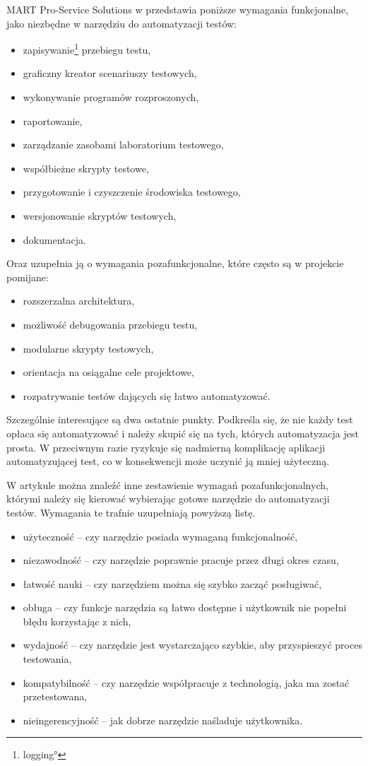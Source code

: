 \documentclass[00-praca-magisterska.tex]{subfiles}
\begin{document}
MART Pro-Service Solutions w \cite{automation-fail} przedstawia poniższe
wymagania funkcjonalne, jako niezbędne w narzędziu do automatyzacji testów:
\begin{itemize}
\item zapisywanie\footnote{\ang{logging}} przebiegu testu,
\item graficzny kreator scenariuszy testowych,
\item wykonywanie programów rozproszonych,
\item raportowanie,
\item zarządzanie zasobami laboratorium testowego,
\item współbieżne skrypty testowe,
\item przygotowanie i czyszczenie środowiska testowego,
\item wersjonowanie skryptów testowych,
\item dokumentacja.
\end{itemize}

Oraz uzupełnia ją o wymagania pozafunkcjonalne, które często są w projekcie
pomijane:
\begin{itemize}
\item rozszerzalna architektura,
\item możliwość debugowania przebiegu testu,
\item modularne skrypty testowych,
\item orientacja na osiągalne cele projektowe,
\item rozpatrywanie testów dających się łatwo automatyzować.
\end{itemize}

Szczególnie interesujące są dwa ostatnie punkty. Podkreśla się, że nie każdy
test opłaca się automatyzować i należy skupić się na tych, których
automatyzacja jest prosta. W przeciwnym razie ryzykuje się nadmierną
komplikację aplikacji automatyzującej test, co w konsekwencji może uczynić ją
mniej użyteczną.

W artykule \cite{snake-oil} można znaleźć inne zestawienie wymagań
pozafunkcjonalnych, którymi należy się kierować wybierając gotowe narzędzie do
automatyzacji testów. Wymagania te trafnie uzupełniają powyższą listę.
\begin{itemize}
\item użyteczność -- czy narzędzie posiada wymaganą funkcjonalność,
\item niezawodność -- czy narzędzie poprawnie pracuje przez długi okres czasu,
\item łatwość nauki -- czy narzędziem można się szybko zacząć posługiwać,
\item obługa -- czy funkcje narzędzia są łatwo dostępne i użytkownik nie popełni błędu korzystając z nich,
\item wydajność -- czy narzędzie jest wystarczająco szybkie, aby przyspieszyć proces testowania,
\item kompatybilność -- czy narzędzie współpracuje z technologią, jaka ma zostać przetestowana,
\item nieingerencyjność -- jak dobrze narzędzie naśladuje użytkownika.
\end{itemize}
\end{document}
